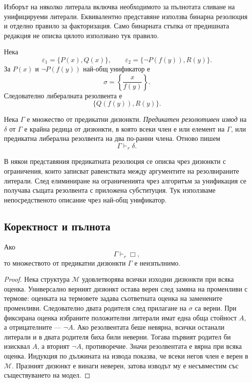 \begin{remark}
Изборът на няколко литерала включва необходимото за пълнотата сливане на унифицируеми литерали. Еквивалентно представяне използва бинарна резолюция и отделно правило за факторизация. Само бинарната стъпка от предишната редакция не описва цялото използвано тук правило.
\end{remark}

\begin{example}
Нека
\[
\varepsilon_1=\{P(x),Q(x)\},
\qquad
\varepsilon_2=\{\neg P(f(y)),R(y)\}.
\]
За $P(x)$ и $\neg P(f(y))$ най-общ унификатор е
\[
\sigma=\left\{\frac{x}{f(y)}\right\}.
\]
Следователно либералната резолвента е
\[
\{Q(f(y)),R(y)\}.
\]
\end{example}

\begin{defn}
Нека $\Gamma$ е множество от предикатни дизюнкти. \emph{Предикатен резолютивен извод} на $\delta$ от $\Gamma$ е крайна редица от дизюнкти, в която всеки член е или елемент на $\Gamma$, или предикатна либерална резолвента на два по-ранни члена. Отново пишем
\[
\Gamma\vdash_r\delta.
\]
\end{defn}

\begin{supp}[Бележка]
В някои представяния предикатната резолюция се описва чрез дизюнкти с ограничения, които записват равенствата между аргументите на резолвираните литерали. След елиминиране на ограниченията чрез алгоритъм за унификация се получава същата резолвента с приложена субституция. Тук използваме непосредственото описание чрез най-общ унификатор.
\end{supp}

\subsection{Коректност и пълнота}\label{s:22.3.3}

\begin{keythm}
Ако
\[
\Gamma\vdash_r\Box,
\]
то множеството от предикатни дизюнкти $\Gamma$ е неизпълнимо.
\end{keythm}

\begin{proof}
Нека структура $\mathcal M$ удовлетворява всички изходни дизюнкти при всяка оценка. Универсално верният дизюнкт остава верен след замяна на променливи с термове: оценката на термовете задава съответната оценка на заменените променливи. Следователно двата родителя след прилагане на $\sigma$ са верни. При фиксирана оценка избраните положителни литерали имат една обща стойност $A$, а отрицателните --- $\neg A$. Ако резолвентата беше невярна, всички останали литерали и в двата родителя биха били неверни. Тогава първият родител би изисквал $A$, а вторият $\neg A$, противоречие. Значи резолвентата е вярна при всяка оценка. Индукция по дължината на извода показва, че всеки негов член е верен в $\mathcal M$. Празният дизюнкт е винаги неверен, затова изводът му е несъвместим със съществуването на модел.
\end{proof}

